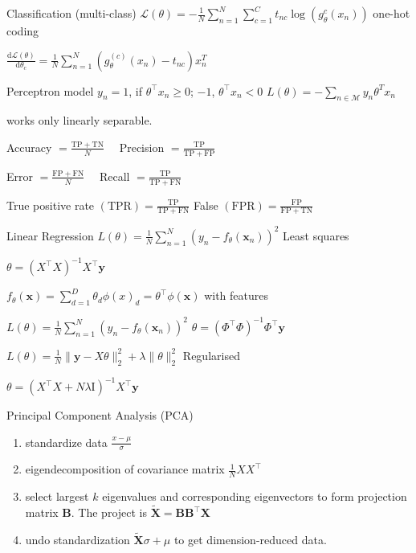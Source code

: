 \documentclass[UTF8,a4paper]{article}
\begin{document}
\begin{multicols}{3}
\begin{cheatsheetblock}{Classification (multi-class)}
    $\mathscr{L}(\theta)=-\frac{1}{N} \sum_{n=1}^N \sum_{c=1}^C t_{n c} \log \left(g_\theta^c\left(x_n\right)\right)$ \hfill one-hot coding

    $\frac{\mathrm{d} \mathscr{L}(\theta)}{\mathrm{d} \theta_c}=\frac{1}{N} \sum_{n=1}^N\left(g_\theta^{(c)}\left(x_n\right)-t_{n c}\right) x_n^T$
\end{cheatsheetblock}

\begin{cheatsheetblock}{Perceptron model}
    $y_n = 1$, if $\theta^\top x_n \geq 0$; $-1$, $\theta^\top x_n < 0$ \hfill $L(\theta)=-\sum_{n \in \mathscr{M}} y_n \theta^T x_n$

    works only linearly separable.

    Accuracy $=\frac{\mathrm{TP}+\mathrm{TN}}{N} \quad$ Precision $=\frac{\mathrm{TP}}{\mathrm{TP}+\mathrm{FP}}$

    Error $=\frac{\mathrm{FP}+\mathrm{FN}}{N} \quad$ Recall $=\frac{\mathrm{TP}}{\mathrm{TP}+\mathrm{FN}} \quad$

    True positive rate $(\mathrm{TPR})=\frac{\mathrm{TP}}{\mathrm{TP}+\mathrm{FN}}$ \hfill False $(\mathrm{FPR})=\frac{\mathrm{FP}}{\mathrm{FP}+\mathrm{TN}}$
\end{cheatsheetblock}

\begin{cheatsheetblock}{Linear Regression}
    $L(\theta)=\frac{1}{N} \sum_{n=1}^N\left(y_n-f_\theta\left(\mathbf{x}_n\right)\right)^2$ \hfill Least squares

    $\theta=\left(X^{\top} X\right)^{-1} X^{\top} \mathbf{y}$

    $f_\theta(\mathbf{x})=\sum_{d=1}^D \theta_d \phi(x)_d=\theta^{\top} \phi(\mathbf{x})$ \hfill with features

    $L(\theta)=\frac{1}{N} \sum_{n=1}^N\left(y_n-f_\theta\left(\mathbf{x}_n\right)\right)^2$ \hfill $\theta=\left(\Phi^{\top} \Phi\right)^{-1} \Phi^{\top} \mathbf{y}$

    $L(\theta)=\frac{1}{N}\|\mathbf{y}-X \theta\|_2^2+\lambda\|\theta\|_2^2$ \hfill Regularised

    $\theta=\left(X^{\top} X+N \lambda \mathrm{I}\right)^{-1} X^{\top} \mathbf{y}$
\end{cheatsheetblock}

\begin{cheatsheetblock}{Principal Component Analysis (PCA)}
    \begin{enumerate}
        \item standardize data $\frac{x-\mu}{\sigma}$
        \item eigendecomposition of covariance matrix $\frac{1}{N}XX^\top$
        \item select largest $k$ eigenvalues and corresponding eigenvectors to form projection matrix $\bm{B}$. The project is $\tilde{\bm{X}} = \bm{B}\bm{B}^\top \bm{X}$
        \item undo standardization $\tilde{\bm{X}} \sigma + \mu$ to get dimension-reduced data.
    \end{enumerate}
\end{cheatsheetblock}

\end{multicols}
\end{document}
